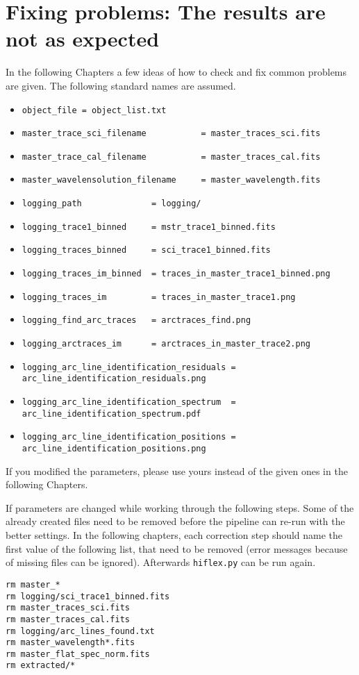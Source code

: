 \documentclass[10pt,a4paper]{article}
\begin{document}
\newpage
\section{Fixing problems: The results are not as expected}
\label{Section:Problem_solution}
In the following Chapters a few ideas of how to check and fix common problems are given. The following standard names are assumed.
\begin{itemize}\small\setlength\itemsep{-0.2cm}
  \item \verb|object_file = object_list.txt|
  \item \verb|master_trace_sci_filename           = master_traces_sci.fits|
  \item \verb|master_trace_cal_filename           = master_traces_cal.fits|
  \item \verb|master_wavelensolution_filename     = master_wavelength.fits|
  \item \verb|logging_path              = logging/|
  \item \verb|logging_trace1_binned     = mstr_trace1_binned.fits|
  \item \verb|logging_traces_binned     = sci_trace1_binned.fits|
  \item \verb|logging_traces_im_binned  = traces_in_master_trace1_binned.png|
  \item \verb|logging_traces_im         = traces_in_master_trace1.png|
  \item \verb|logging_find_arc_traces   = arctraces_find.png|
  \item \verb|logging_arctraces_im      = arctraces_in_master_trace2.png|
  \item \verb|logging_arc_line_identification_residuals = arc_line_identification_residuals.png|
  \item \verb|logging_arc_line_identification_spectrum  = arc_line_identification_spectrum.pdf|
  \item \verb|logging_arc_line_identification_positions = arc_line_identification_positions.png|
\end{itemize}
If you modified the parameters, please use yours instead of the given ones in the following Chapters.

If parameters are changed while working through the following steps. Some of the already created files need to be removed before the pipeline can re-run with the better settings. In the following chapters, each correction step should name the first value of the following list, that need to be removed (error messages because of missing files can be ignored). Afterwards \verb|hiflex.py| can be run again.
\begin{lstlisting}[style=base]
rm master_*
rm logging/sci_trace1_binned.fits
rm master_traces_sci.fits
rm master_traces_cal.fits
rm logging/arc_lines_found.txt
rm master_wavelength*.fits 
rm master_flat_spec_norm.fits
rm extracted/*
\end{lstlisting}
\end{document}
